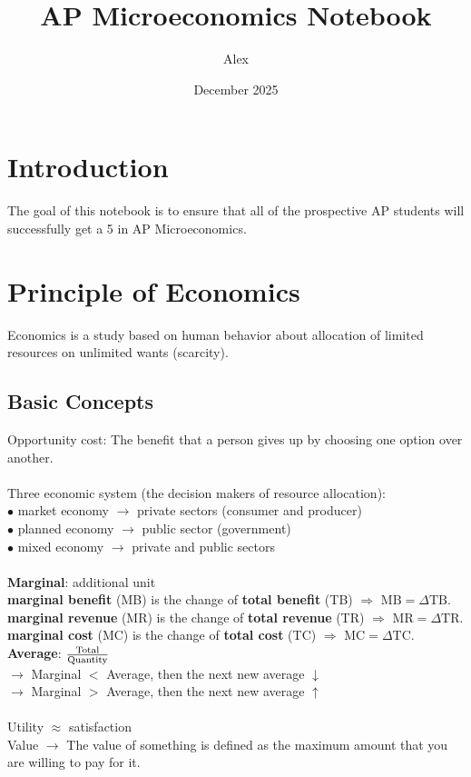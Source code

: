 \documentclass[UTF8]{article}
\title{AP Microeconomics Notebook}
\author{Alex}
\date{December 2025}
\begin{document}
\maketitle
\tableofcontents
\newpage
{}
\section{Introduction}
The goal of this notebook is to ensure that all of the prospective AP students will successfully get a 5 in AP Microeconomics.

\section{Principle of Economics}
Economics is a study based on human behavior about allocation of limited resources on unlimited wants (scarcity).
\subsection{Basic Concepts}
Opportunity cost: The benefit that a person gives up by choosing one option over another.\\
\\
\noindent
Three economic system (the decision makers of resource allocation):\\
$\bullet$ market economy $\longrightarrow$ private sectors (consumer and producer)\\
$\bullet$ planned economy $\longrightarrow$ public sector (government)\\
$\bullet$ mixed economy $\longrightarrow$ private and public sectors\\
\\
\textbf{Marginal}: additional unit \\
\textbf{marginal benefit} (MB) is the change of \textbf{total benefit} (TB) $\Longrightarrow$ $\text{MB}=\Delta \text{TB}$.\\
\textbf{marginal revenue} (MR) is the change of \textbf{total revenue} (TR) $\Longrightarrow$ $\text{MR}=\Delta \text{TR}$.\\
\textbf{marginal cost} (MC) is the change of \textbf{total cost} (TC) $\Longrightarrow$ $\text{MC}=\Delta \text{TC}$.\\
\textbf{Average}: $\text{Total}\over \text{Quantity}$ \\
$\longrightarrow$ Marginal $<$ Average, then the next new average $\downarrow$\\
$\longrightarrow$ Marginal $>$ Average, then the next new average $\uparrow$\\
\\
Utility $\approx$ satisfaction\\
Value $\longrightarrow$ The value of something is defined as the maximum amount that you are willing to pay for it.
\end{document}
